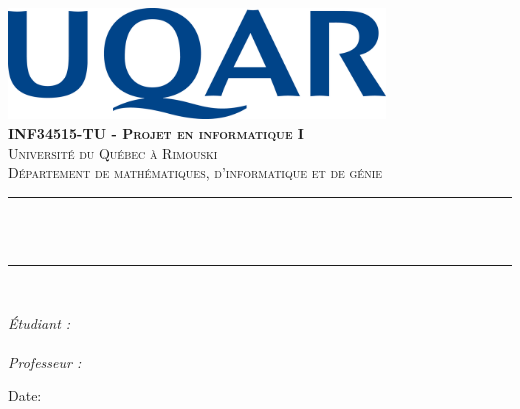 \begin{titlepage}

\newcommand{\HRule}{\rule{\linewidth}{0.5mm}} %





\begin{center} %


\includegraphics[width = 10cm]{uqar}\\[1.5cm] 
\textbf{\textsc{\Large INF34515-TU - Projet en informatique I}}\\[1.0cm] 
\textsc{\Large Université du Québec à Rimouski}\\[0.5cm] 
\textsc{\large Département de mathématiques, d'informatique et de génie}\\[0.95cm] 


\HRule \\[0.4cm]
{ \huge \bfseries \reporttitle}\\ %
\HRule \\[1.5cm]
\end{center}

\begin{flushleft} \large
\textit{Étudiant :}\\
\reportauthorOne \\ %
\vspace{0.5cm}
\textit{Professeur :}\\
\reportauthorTwo
\end{flushleft}
\vspace{3.5cm}
\makeatletter
Date: \@date 

\vfill %



\makeatother


\end{titlepage}

